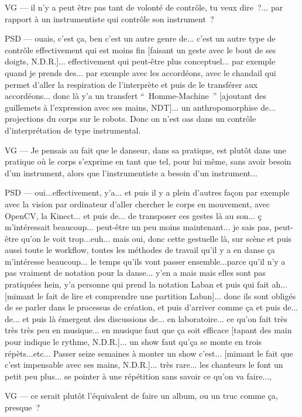 VG — il n'y a peut être pas tant de volonté de contrôle, tu veux dire ?... par rapport à un instrumentiste qui contrôle son instrument ?

PSD — ouais, c'est ça, ben c'est un autre genre de... c'est un autre type de contrôle effectivement qui est moins fin [faisant un geste avec le bout de ses doigts, N.D.R.]... effectivement qui peut-être plus conceptuel... par exemple quand je prends des... par exemple avec les accordéons, avec le chandail qui permet d'aller la respiration de l'interprète et puis de le transférer aux accordéons... donc là y'a un transfert “ Homme-Machine ” [ajoutant des guillemets à l'expression avec ses mains, NDT]... un anthropomorphise de... projections du corps sur le robots. Donc on n'est oas dans un contrôle d'interprétation de type instrumental.

VG — Je pensais au fait que le danseur, dans sa pratique, est plutôt dans une pratique où le corps s'exprime en tant que tel, pour lui même, sans avoir besoin d'un instrument, alors que l'instrumentiste a besoin d'un instrument...

PSD — oui...effectivement, y'a... et puis il y a plein d'autres façon par exemple avec la vision par ordinateur d'aller chercher le corps en mouvement, avec OpenCV, la Kinect... et puis de... de transposer ces gestes là au son... ç m'intéressait beaucoup... peut-être un peu moins maintenant... je sais pas, peut-être qu'on le voit trop...euh... mais oui, donc cette gestuelle là, sur scène et puis aussi toute le workflow, toutes les méthodes de travail qu'il y a en danse ça m'intéresse beaucoup... le temps qu'ils vont passer ensemble...parce qu'il n'y a pas vraiment de notation pour la danse... y'en a mais mais elles sont pas pratiquées hein, y'a personne qui prend la notation Laban et puis qui fait ah... [mimant le fait de lire et comprendre une partition Laban]... donc ils sont obligés de se parler dans le processus de création, et puis d'arriver comme ça et puis de... de... et puis là émergent des discussions de... en laboratoire... ce qu'on fait très très très peu en musique... en musique faut que ça soit efficace [tapant des main pour indique le rythme,  N.D.R.]... un show faut qu'ça se monte en trois répèts...etc... Passer seize semaines à monter un show c'est... [mimant le fait que c'est impensable avec ses mains,  N.D.R.]... très rare... les chanteurs le font un petit peu plus... se pointer à une répétition sans savoir ce qu'on va faire..., 


VG — ce serait plutôt l'équivalent de faire un album, ou un truc comme ça, presque ?

